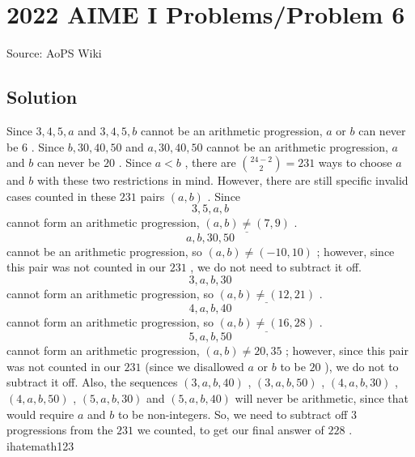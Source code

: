 \documentclass[12pt]{article}
\begin{document}
\section*{{2022 AIME I Problems/Problem 6}}
Source: AoPS Wiki

\subsection*{Solution}
Since $3,4,5,a$ and $3,4,5,b$ cannot be an arithmetic progression, $a$ or $b$ can never be $6$ . Since $b, 30, 40, 50$ and $a, 30, 40, 50$ cannot be an arithmetic progression, $a$ and $b$ can never be $20$ . Since $a < b$ , there are ${24 - 2 \choose 2} = 231$ ways to choose $a$ and $b$ with these two restrictions in mind. However, there are still specific invalid cases counted in these $231$ pairs $(a,b)$ . Since \[3,5,a,b\] cannot form an arithmetic progression, $\underline{(a,b) \neq (7,9)}$ . \[a,b,30,50\] cannot be an arithmetic progression, so $(a,b) \neq (-10,10)$ ; however, since this pair was not counted in our $231$ , we do not need to subtract it off. \[3,a,b,30\] cannot form an arithmetic progression, so $\underline{(a,b) \neq (12,21)}$ . \[4, a, b, 40\] cannot form an arithmetic progression, so $\underline{(a,b) \neq (16,28)}$ . \[5, a,b, 50\] cannot form an arithmetic progression, $(a,b) \neq 20, 35$ ; however, since this pair was not counted in our $231$ (since we disallowed $a$ or $b$ to be $20$ ), we do not to subtract it off. Also, the sequences $(3,a,b,40)$ , $(3,a,b,50)$ , $(4,a,b,30)$ , $(4,a,b,50)$ , $(5,a,b,30)$ and $(5,a,b,40)$ will never be arithmetic, since that would require $a$ and $b$ to be non-integers. So, we need to subtract off $3$ progressions from the $231$ we counted, to get our final answer of $\boxed{228}$ . ~ ihatemath123
\end{document}
